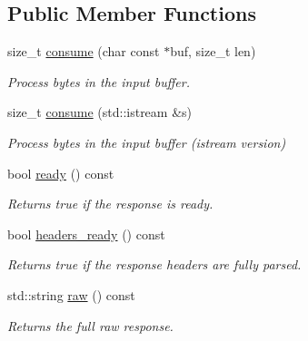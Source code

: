 \subsection*{Public Member Functions}
\begin{DoxyCompactItemize}
\item 
size\+\_\+t \mbox{\hyperlink{classwebsocketpp_1_1http_1_1parser_1_1response_ae99b8f1287898b74d1963b95347ab838}{consume}} (char const $\ast$buf, size\+\_\+t len)
\begin{DoxyCompactList}\small\item\em Process bytes in the input buffer. \end{DoxyCompactList}\item 
size\+\_\+t \mbox{\hyperlink{classwebsocketpp_1_1http_1_1parser_1_1response_a5b274a9e5766e679f0939a7e1ecbad56}{consume}} (std\+::istream \&s)
\begin{DoxyCompactList}\small\item\em Process bytes in the input buffer (istream version) \end{DoxyCompactList}\item 
bool \mbox{\hyperlink{classwebsocketpp_1_1http_1_1parser_1_1response_ab3f1f2bb2c79a779a8e7d649ea722421}{ready}} () const
\begin{DoxyCompactList}\small\item\em Returns true if the response is ready. \end{DoxyCompactList}\item 
\mbox{\label{classwebsocketpp_1_1http_1_1parser_1_1response_a844549873f4b6c36d04c141925ee2dd2}} 
bool \mbox{\hyperlink{classwebsocketpp_1_1http_1_1parser_1_1response_a844549873f4b6c36d04c141925ee2dd2}{headers\+\_\+ready}} () const
\begin{DoxyCompactList}\small\item\em Returns true if the response headers are fully parsed. \end{DoxyCompactList}\item 
\mbox{\label{classwebsocketpp_1_1http_1_1parser_1_1response_a46ebda97244f3235eaaccb1bcbdc5666}} 
std\+::string \mbox{\hyperlink{classwebsocketpp_1_1http_1_1parser_1_1response_a46ebda97244f3235eaaccb1bcbdc5666}{raw}} () const
\begin{DoxyCompactList}\small\item\em Returns the full raw response. \end{DoxyCompactList}\item 

\end{DoxyCompactItemize}

